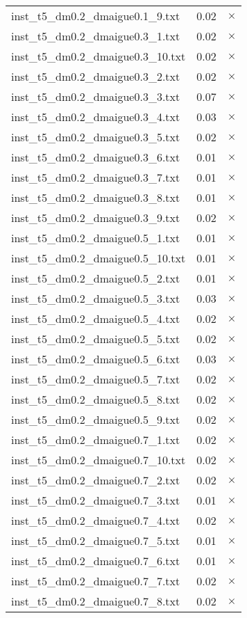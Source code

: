 \documentclass{article}
\begin{document}
\begin{center}
\begin{tabular}{lrr}
inst\_t5\_dm0.2\_dmaigue0.1\_9.txt & 0.02 & 
$\times$
\\
inst\_t5\_dm0.2\_dmaigue0.3\_1.txt & 0.02 & 
$\times$
\\
inst\_t5\_dm0.2\_dmaigue0.3\_10.txt & 0.02 & 
$\times$
\\
inst\_t5\_dm0.2\_dmaigue0.3\_2.txt & 0.02 & 
$\times$
\\
inst\_t5\_dm0.2\_dmaigue0.3\_3.txt & 0.07 & 
$\times$
\\
inst\_t5\_dm0.2\_dmaigue0.3\_4.txt & 0.03 & 
$\times$
\\
inst\_t5\_dm0.2\_dmaigue0.3\_5.txt & 0.02 & 
$\times$
\\
inst\_t5\_dm0.2\_dmaigue0.3\_6.txt & 0.01 & 
$\times$
\\
inst\_t5\_dm0.2\_dmaigue0.3\_7.txt & 0.01 & 
$\times$
\\
inst\_t5\_dm0.2\_dmaigue0.3\_8.txt & 0.01 & 
$\times$
\\
inst\_t5\_dm0.2\_dmaigue0.3\_9.txt & 0.02 & 
$\times$
\\
inst\_t5\_dm0.2\_dmaigue0.5\_1.txt & 0.01 & 
$\times$
\\
inst\_t5\_dm0.2\_dmaigue0.5\_10.txt & 0.01 & 
$\times$
\\
inst\_t5\_dm0.2\_dmaigue0.5\_2.txt & 0.01 & 
$\times$
\\
inst\_t5\_dm0.2\_dmaigue0.5\_3.txt & 0.03 & 
$\times$
\\
inst\_t5\_dm0.2\_dmaigue0.5\_4.txt & 0.02 & 
$\times$
\\
inst\_t5\_dm0.2\_dmaigue0.5\_5.txt & 0.02 & 
$\times$
\\
inst\_t5\_dm0.2\_dmaigue0.5\_6.txt & 0.03 & 
$\times$
\\
inst\_t5\_dm0.2\_dmaigue0.5\_7.txt & 0.02 & 
$\times$
\\
inst\_t5\_dm0.2\_dmaigue0.5\_8.txt & 0.02 & 
$\times$
\\
inst\_t5\_dm0.2\_dmaigue0.5\_9.txt & 0.02 & 
$\times$
\\
inst\_t5\_dm0.2\_dmaigue0.7\_1.txt & 0.02 & 
$\times$
\\
inst\_t5\_dm0.2\_dmaigue0.7\_10.txt & 0.02 & 
$\times$
\\
inst\_t5\_dm0.2\_dmaigue0.7\_2.txt & 0.02 & 
$\times$
\\
inst\_t5\_dm0.2\_dmaigue0.7\_3.txt & 0.01 & 
$\times$
\\
inst\_t5\_dm0.2\_dmaigue0.7\_4.txt & 0.02 & 
$\times$
\\
inst\_t5\_dm0.2\_dmaigue0.7\_5.txt & 0.01 & 
$\times$
\\
inst\_t5\_dm0.2\_dmaigue0.7\_6.txt & 0.01 & 
$\times$
\\
inst\_t5\_dm0.2\_dmaigue0.7\_7.txt & 0.02 & 
$\times$
\\
inst\_t5\_dm0.2\_dmaigue0.7\_8.txt & 0.02 & 
$\times$
\\
\hline\end{tabular}
\end{center}
\end{document}
